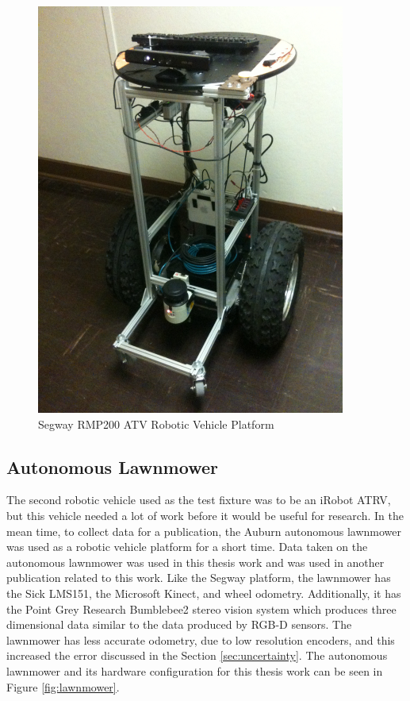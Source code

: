 \documentclass[12pt]{report}
\begin{document}
\begin{figure}[ht]
  \centering
  \includegraphics[width=4in,keepaspectratio]{segway.jpg}
  \caption{Segway RMP200 ATV Robotic Vehicle Platform}
  \label{fig:segway_rmp200}
\end{figure}

\subsection{Autonomous Lawnmower}
The second robotic vehicle used as the test fixture was to be an iRobot ATRV, but this vehicle needed a lot of work before it would be useful for research.  In the mean time, to collect data for a publication, the Auburn autonomous lawnmower was used as a robotic vehicle platform for a short time.  Data taken on the autonomous lawnmower was used in this thesis work and was used in another publication related to this work.  Like the Segway platform, the lawnmower has the Sick LMS151, the Microsoft Kinect, and wheel odometry.  Additionally, it has the Point Grey Research Bumblebee2 stereo vision system which produces three dimensional data similar to the data produced by RGB-D sensors.  The lawnmower has less accurate odometry, due to low resolution encoders, and this increased the error discussed in the Section \ref{sec:uncertainty}.  The autonomous lawnmower and its hardware configuration for this thesis work can be seen in Figure \ref{fig:lawnmower}.
\end{document}
